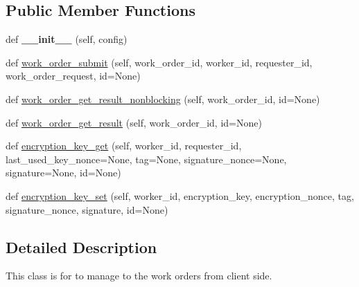 \subsection*{Public Member Functions}
\begin{DoxyCompactItemize}
\item 
\mbox{\label{classavalon__sdk_1_1connector_1_1direct_1_1jrpc_1_1jrpc__work__order_1_1JRPCWorkOrderImpl_a042821e69f3220a877ca908185f25b29}} 
def {\bfseries \+\_\+\+\_\+init\+\_\+\+\_\+} (self, config)
\item 
def \hyperlink{classavalon__sdk_1_1connector_1_1direct_1_1jrpc_1_1jrpc__work__order_1_1JRPCWorkOrderImpl_a0abd85babf4a7cd74a197455b5ae288a}{work\+\_\+order\+\_\+submit} (self, work\+\_\+order\+\_\+id, worker\+\_\+id, requester\+\_\+id, work\+\_\+order\+\_\+request, id=None)
\item 
def \hyperlink{classavalon__sdk_1_1connector_1_1direct_1_1jrpc_1_1jrpc__work__order_1_1JRPCWorkOrderImpl_a618380f6d69599112d3bd7b55df71722}{work\+\_\+order\+\_\+get\+\_\+result\+\_\+nonblocking} (self, work\+\_\+order\+\_\+id, id=None)
\item 
def \hyperlink{classavalon__sdk_1_1connector_1_1direct_1_1jrpc_1_1jrpc__work__order_1_1JRPCWorkOrderImpl_a29815c22c7833a206bbfa4ee3ef0b7a3}{work\+\_\+order\+\_\+get\+\_\+result} (self, work\+\_\+order\+\_\+id, id=None)
\item 
def \hyperlink{classavalon__sdk_1_1connector_1_1direct_1_1jrpc_1_1jrpc__work__order_1_1JRPCWorkOrderImpl_ab3d77319022f981c2c6584aff68cdbfe}{encryption\+\_\+key\+\_\+get} (self, worker\+\_\+id, requester\+\_\+id, last\+\_\+used\+\_\+key\+\_\+nonce=None, tag=None, signature\+\_\+nonce=None, signature=None, id=None)
\item 
def \hyperlink{classavalon__sdk_1_1connector_1_1direct_1_1jrpc_1_1jrpc__work__order_1_1JRPCWorkOrderImpl_a556dba59e738309f2bac9ba578aabae6}{encryption\+\_\+key\+\_\+set} (self, worker\+\_\+id, encryption\+\_\+key, encryption\+\_\+nonce, tag, signature\+\_\+nonce, signature, id=None)
\end{DoxyCompactItemize}


\subsection{Detailed Description}
\begin{DoxyVerb}This class is for to manage to the work orders from client side.
\end{DoxyVerb}
 

